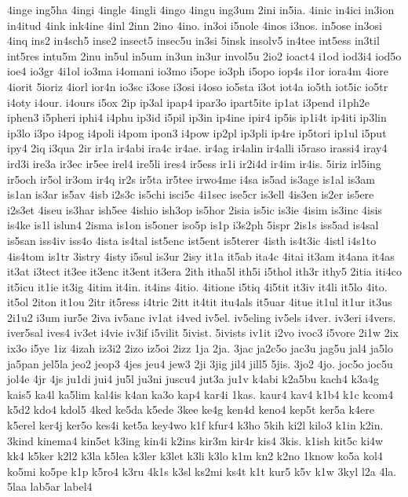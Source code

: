 {4inge
ing5ha
4ingi
4ingle
4ingli
4ingo
4ingu
ing3um
2ini
in5ia.
4inic
in4ici
in3ion
in4itud
4ink
ink4ine
4inl
2inn
2ino
4ino.
in3oi
i5nole
4inos
i3nos.
in5ose
in3osi
4inq
ins2
in4sch5
inse2
insect5
insec5u
in3si
5insk
insolv5
in4tee
int5ess
in3til
int5res
intu5m
2inu
in5ul
in5um
in3un
in3ur
invol5u
2io2
ioact4
i1od
iod3i4
iod5o
ioe4
io3gr
4i1ol
io3ma
i4omani
io3mo
i5ope
io3ph
i5opo
iop4s
i1or
iora4m
4iore
4iorit
5ioriz
4iorl
ior4n
io3sc
i3ose
i3osi
i4oso
io5sta
i3ot
iot4a
io5th
iot5ic
io5tr
i4oty
i4our.
i4ours
i5ox
2ip
ip3al
ipap4
ipar3o
ipart5ite
ip1at
i3pend
i1ph2e
iphen3
i5pheri
iphi4
i4phu
ip3id
i5pil
ip3in
ip4ine
ipir4
ip5is
ip1i4t
ip4iti
ip3lin
ip3lo
i3po
i4pog
i4poli
i4pom
ipon3
i4pow
ip2pl
ip3pli
ip4re
ip5tori
ip1ul
i5put
ipy4
2iq
i3qua
2ir
ir1a
ir4abi
ira4c
ir4ae.
ir4ag
ir4alin
ir4alli
i5raso
irassi4
iray4
ird3i
ire3a
ir3ec
ir5ee
irel4
ire5li
ires4
ir5ess
ir1i
ir2i4d
ir4im
ir4is.
5iriz
irl5ing
ir5och
ir5ol
ir3om
ir4q
ir2s
ir5ta
ir5tee
irwo4me
i4sa
is5ad
is3age
is1al
is3am
is1an
is3ar
is5av
4isb
i2s3c
is5chi
isci5c
4i1sec
ise5cr
is3ell
4is3en
is2er
is5ere
i2s3et
4iseu
is3har
ish5ee
4ishio
ish3op
is5hor
2isia
is5ic
is3ie
4isim
is3inc
4isis
is4ke
is1l
islun4
2isma
is1on
is5oner
iso5p
is1p
i3s2ph
5ispr
2is1s
iss5ad
is4sal
is5san
iss4iv
iss4o
4ista
is4tal
ist5enc
ist5ent
is5terer
4isth
is4t3ic
4istl
i4s1to
4is4tom
is1tr
3istry
4isty
i5sul
is3ur
2isy
it1a
it5ab
ita4c
4itai
it3am
it4ana
it4as
it3at
i3tect
it3ee
it3enc
it3ent
it3era
2ith
itha5l
ith5i
i5thol
ith3r
ithy5
2itia
iti4co
it5icu
it1ie
it3ig
4itim
it4in.
it4ins
4itio.
4itione
i5tiq
4i5tit
it3iv
it4li
it5lo
4ito.
it5ol
2iton
it1ou
2itr
it5ress
i4tric
2itt
it4tit
itu4als
it5uar
4itue
it1ul
it1ur
it3us
2i1u2
i3um
iur5e
2iva
iv5anc
iv1at
i4ved
iv5el.
iv5eling
iv5els
i4ver.
iv3eri
i4vers.
iver5sal
ives4
iv3et
i4vie
iv3if
i5vilit
5ivist.
5ivists
iv1it
i2vo
ivoc3
i5vore
2i1w
2ix
ix3o
i5ye
1iz
4izah
iz3i2
2izo
iz5oi
2izz
1ja
2ja.
3jac
ja2c5o
jac3u
jag5u
jal4
ja5lo
ja5pan
jel5la
jeo2
jeop3
4jes
jeu4
jew3
2ji
3jig
jil4
jill5
5jis.
3jo2
4jo.
joc5o
joc5u
jol4e
4jr
4js
ju1di
jui4
ju5l
ju3ni
juscu4
jut3a
ju1v
k4abi
k2a5bu
kach4
k3a4g
kais5
ka4l
ka5lim
kal4is
k4an
ka3o
kap4
kar4i
1kas.
kaur4
kav4
k1b4
k1c
kcom4
k5d2
kdo4
kdol5
4ked
ke5da
k5ede
3kee
ke4g
ken4d
keno4
kep5t
ker5a
k4ere
k5erel
ker4j
ker5o
kes4i
ket5a
key4wo
k1f
kfur4
k3ho
5kih
ki2l
kilo3
k1in
k2in.
3kind
kinema4
kin5et
k3ing
kin4i
k2ins
kir3m
kir4r
kis4
3kis.
k1ish
kit5c
ki4w
kk4
k5ker
k2l2
k3la
k5lea
k3ler
k3let
k3li
k3lo
k1m
kn2
k2no
1know
ko5a
kol4
ko5mi
ko5pe
k1p
k5ro4
k3ru
4k1s
k3sl
ks2mi
ks4t
k1t
kur5
k5v
k1w
3kyl
l2a
4la.
5laa
lab5ar
label4
}
